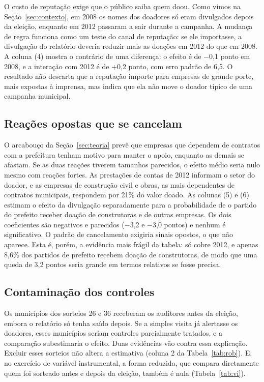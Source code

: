 O custo de reputação exige que o público saiba quem doou. Como vimos na
Seção~\ref{sec:contexto}, em 2008 os nomes dos doadores só eram divulgados depois da eleição, enquanto em
2012 passaram a sair durante a campanha. A mudança de regra funciona como um teste do canal de reputação:
se ele importasse, a divulgação do relatório deveria reduzir mais as doações em 2012 do que em 2008. A
coluna (4) mostra o contrário de uma diferença: o efeito é de $-$0,1 ponto em 2008, e a interação com 2012
é de $+$0,2 ponto, com erro padrão de 6,5. O resultado não descarta que a reputação importe para
empresas de grande porte, mais expostas à imprensa, mas indica que ela não move o doador típico de uma
campanha municipal.

\subsection{Reações opostas que se cancelam}

O arcabouço da Seção~\ref{sec:teoria} prevê que empresas que dependem
de contratos com a prefeitura tenham motivo para manter o apoio, enquanto as demais se afastam. Se as duas
reações tiverem tamanhos parecidos, o efeito médio seria nulo mesmo com reações fortes. As prestações de
contas de 2012 informam o setor do doador, e as empresas de construção civil e obras, as mais dependentes de
contratos municipais, respondem por 21\% do valor doado. As colunas (5) e (6) estimam o efeito da
divulgação separadamente para a probabilidade de o partido do prefeito receber doação de construtoras e de
outras empresas. Os dois coeficientes são negativos e parecidos ($-$3,2 e $-$3,0 pontos) e nenhum é
significativo. O padrão de cancelamento exigiria sinais opostos, o que não aparece. Esta é, porém, a
evidência mais frágil da tabela: só cobre 2012, e apenas 8,6\% dos partidos de prefeito recebem doação de
construtoras, de modo que uma queda de 3,2 pontos seria grande em termos relativos se fosse precisa.

\subsection{Contaminação dos controles}

Os municípios dos sorteios 26 e 36 receberam os auditores antes da
eleição, embora o relatório só tenha saído depois. Se a simples visita já alertasse os doadores, esses
municípios seriam controles parcialmente tratados, e a comparação subestimaria o efeito. Duas evidências vão
contra essa explicação. Excluir esses sorteios não altera a estimativa (coluna 2 da Tabela~\ref{tab:rob}).
E, no exercício de variável instrumental, a forma reduzida, que compara diretamente quem foi sorteado antes
e depois da eleição, também é nula (Tabela~\ref{tab:vi}).

